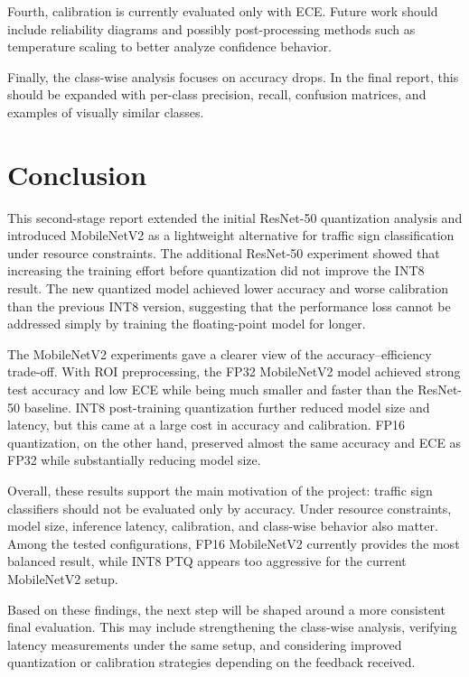\documentclass{article} %
\begin{document}
Fourth, calibration is currently evaluated only with ECE. Future work should include reliability diagrams and possibly post-processing methods such as temperature scaling to better analyze confidence behavior.

Finally, the class-wise analysis focuses on accuracy drops. In the final report, this should be expanded with per-class precision, recall, confusion matrices, and examples of visually similar classes.

\section{Conclusion}

This second-stage report extended the initial ResNet-50 quantization analysis and introduced MobileNetV2 as a lightweight alternative for traffic sign classification under resource constraints. The additional ResNet-50 experiment showed that increasing the training effort before quantization did not improve the INT8 result. The new quantized model achieved lower accuracy and worse calibration than the previous INT8 version, suggesting that the performance loss cannot be addressed simply by training the floating-point model for longer.

The MobileNetV2 experiments gave a clearer view of the accuracy--efficiency trade-off. With ROI preprocessing, the FP32 MobileNetV2 model achieved strong test accuracy and low ECE while being much smaller and faster than the ResNet-50 baseline. INT8 post-training quantization further reduced model size and latency, but this came at a large cost in accuracy and calibration. FP16 quantization, on the other hand, preserved almost the same accuracy and ECE as FP32 while substantially reducing model size.

Overall, these results support the main motivation of the project: traffic sign classifiers should not be evaluated only by accuracy. Under resource constraints, model size, inference latency, calibration, and class-wise behavior also matter. Among the tested configurations, FP16 MobileNetV2 currently provides the most balanced result, while INT8 PTQ appears too aggressive for the current MobileNetV2 setup.

Based on these findings, the next step will be shaped around a more consistent final evaluation. This may include strengthening the class-wise analysis, verifying latency measurements under the same setup, and considering improved quantization or calibration strategies depending on the feedback received.
\end{document}
